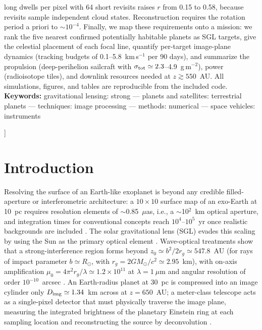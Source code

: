 ﻿\documentclass[twocolumn,10pt]{article}
\begin{document}
{\begin{center}
\begin{minipage}{0.86\textwidth}
long dwells per pixel with 64 short revisits raises $r$ from 0.15 to 0.58,
because revisits sample independent cloud states. Reconstruction requires
the rotation period a priori to $\sim10^{-4}$. Finally, we map these
requirements onto a mission: we rank the five nearest confirmed
potentially habitable planets as SGL targets, give the celestial
placement of each focal line, quantify per-target image-plane dynamics
(tracking budgets of 0.1--5.8~km\,s$^{-1}$ per 90 days), and summarize the
propulsion (deep-perihelion sailcraft with
$\sigma_{\rm tot}\simeq2.3$--4.9~g\,m$^{-2}$), power (radioisotope tiles),
and downlink resources needed at $z\gtrsim550$~AU. All simulations,
figures, and tables are reproducible from the included code.
\\[2mm]
\textbf{Keywords:} gravitational lensing: strong --- planets and
satellites: terrestrial planets --- techniques: image processing ---
methods: numerical --- space vehicles: instruments
\end{minipage}
\end{center}
\vspace{6mm}
}]




\section{Introduction}
\label{sec:intro}

Resolving the surface of an Earth-like exoplanet is beyond any credible
filled-aperture or interferometric architecture: a $10\times10$ surface
map of an exo-Earth at 10~pc requires resolution elements of
$\sim$0.85~$\mu$as, i.e., a $\sim$10$^2$~km optical aperture, and
integration times for conventional concepts reach $10^4$--$10^5$~yr once
realistic backgrounds are included \citep{tur26direct}. The solar
gravitational lens (SGL) evades this scaling by using the Sun as the
primary optical element \citep{eshleman79,tt17}. Wave-optical treatments
show that a strong-interference region forms beyond
$z_0\simeq b^2/2r_g\simeq547.8$~AU (for rays of impact parameter
$b\simeq R_\odot$, with $r_g=2GM_\odot/c^2\simeq2.95$~km), with on-axis
amplification $\mu_0=4\pi^2 r_g/\lambda\simeq1.2\times10^{11}$ at
$\lambda=1~\mu$m and angular resolution of order $10^{-10}$~arcsec
\citep{tt17,tt19}. An Earth-radius planet at 30~pc is compressed into an
image cylinder only $D_{\rm img}\simeq1.34$~km across at $z=650$~AU; a
meter-class telescope acts as a single-pixel detector that must
physically traverse the image plane, measuring the integrated brightness
of the planetary Einstein ring at each sampling location and
reconstructing the source by deconvolution
\citep{tt20psf,toth21,tt22mnras}.
\end{document}

